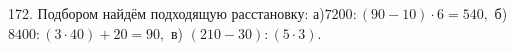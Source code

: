 172. Подбором найдём подходящую расстановку: а)$7200:(90-10)\cdot6=540,$ б) $8400:(3\cdot40)+20=90,$ в) $(210-30):(5\cdot3).$\\

